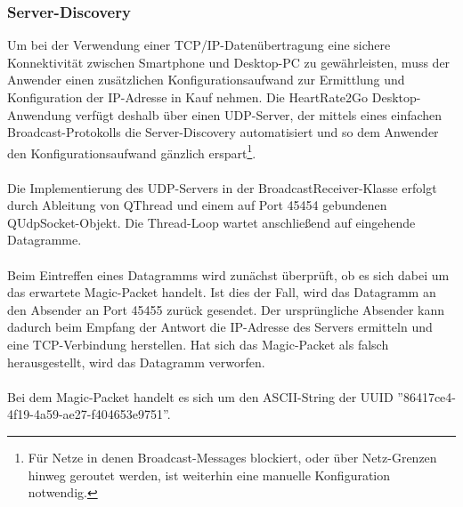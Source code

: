 \subsubsection{Server-Discovery}
Um bei der Verwendung einer TCP/IP-Datenübertragung eine sichere Konnektivität zwischen Smartphone und Desktop-PC zu gewährleisten, muss der Anwender einen zusätzlichen Konfigurationsaufwand zur Ermittlung und Konfiguration der IP-Adresse in Kauf nehmen. Die HeartRate2Go Desktop-Anwendung verfügt deshalb über einen UDP-Server, der mittels eines einfachen Broadcast-Protokolls die Server-Discovery automatisiert und so dem Anwender den Konfigurationsaufwand gänzlich erspart\footnote{Für Netze in denen Broadcast-Messages blockiert, oder über Netz-Grenzen hinweg geroutet werden, ist weiterhin eine manuelle Konfiguration notwendig.}.\\
\\
Die Implementierung des UDP-Servers in der BroadcastReceiver-Klasse erfolgt durch Ableitung von QThread und einem auf Port 45454 gebundenen QUdpSocket-Objekt\cite{qudpsocket}. Die Thread-Loop wartet anschließend auf eingehende Datagramme.\\
\\
Beim Eintreffen eines Datagramms wird zunächst überprüft, ob es sich dabei um das erwartete Magic-Packet handelt. Ist dies der Fall, wird das Datagramm an den Absender an Port 45455 zurück gesendet. Der ursprüngliche Absender kann dadurch beim Empfang der Antwort die IP-Adresse des Servers ermitteln und eine TCP-Verbindung herstellen. Hat sich das Magic-Packet als falsch herausgestellt, wird das Datagramm verworfen.\\
\\
Bei dem Magic-Packet handelt es sich um den ASCII-String der UUID ''86417ce4-4f19-4a59-ae27-f404653e9751''.

